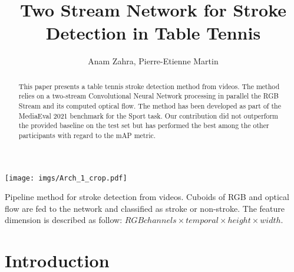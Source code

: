 \documentclass[sigconf]{acmart-me}
\begin{document}
\title{Two Stream Network for Stroke Detection in Table Tennis}



\author{Anam Zahra, Pierre-Etienne Martin}




\renewcommand{\shorttitle}{Sports Video Task}


\begin{abstract}
This paper presents a table tennis stroke detection method from videos. The method relies on a two-stream Convolutional Neural Network processing in parallel the RGB Stream and its computed optical flow. The method has been developed as part of the MediaEval 2021 benchmark for the Sport task. Our contribution did not outperform the provided baseline on the test set but has performed the best among the other participants with regard to the mAP metric.
\end{abstract}

\begin{teaserfigure}
    \texttt{[image: imgs/Arch\_1\_crop.pdf]}
    \caption{Pipeline method for stroke detection from videos. Cuboids of RGB and optical flow are fed to the network and classified as stroke or non-stroke. The feature dimension is described as follow: $RGB channels \times temporal \times height \times width$.
    }
    \label{fig:model_fig}
\end{teaserfigure}




\maketitle

\section{Introduction}
\label{sec:intro}
\end{document}

